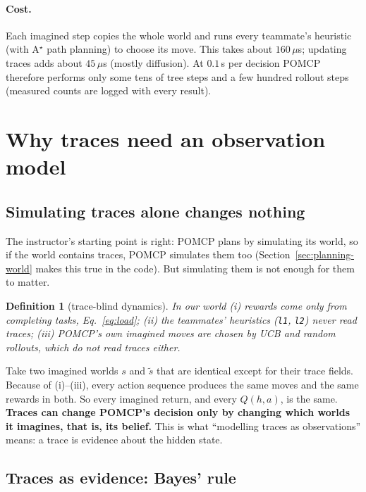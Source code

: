 \documentclass[11pt,a4paper]{article}
\newcommand{\code}[1]{\texttt{#1}}
\newtheorem{definition}{Definition}
\theoremstyle{remark}
\begin{document}
\paragraph{Cost.} Each imagined step copies the whole world and runs every teammate's heuristic (with A$^\star$ path
planning) to choose its move. This takes about $160\,\mu$s; updating traces adds about $45\,\mu$s (mostly diffusion).
At $0.1$\,s per decision POMCP therefore performs only some tens of tree steps and a few hundred rollout steps (measured
counts are logged with every result).

\section{Why traces need an observation model}
\label{sec:observation-model}

\subsection{Simulating traces alone changes nothing}

The instructor's starting point is right: POMCP plans by simulating its world, so if the world contains traces,
POMCP simulates them too (Section~\ref{sec:planning-world} makes this true in the code). But simulating them is not
enough for them to matter.

\begin{definition}[trace-blind dynamics]
In our world (i) rewards come only from completing tasks, Eq.~\eqref{eq:load}; (ii) the teammates' heuristics
(\code{l1}, \code{l2}) never read traces; (iii) POMCP's own imagined moves are chosen by UCB and random rollouts, which
do not read traces either.
\end{definition}
Take two imagined worlds $s$ and $\tilde s$ that are identical except for their trace fields. Because of (i)--(iii),
every action sequence produces the same moves and the same rewards in both. So every imagined return, and every
$Q(h,a)$, is the same. \textbf{Traces can change POMCP's decision only by changing which worlds it imagines, that is, its
belief.} This is what ``modelling traces as observations'' means: a trace is evidence about the hidden state.

\subsection{Traces as evidence: Bayes' rule}
\end{document}
